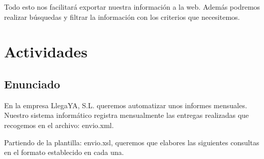 Todo esto nos facilitará exportar nuestra información a la web. Además podremos realizar búsquedas y filtrar la información con los criterios que necesitemos.

\section{Actividades}

\subsection{Enunciado}
En la empresa LlegaYA, S.L. queremos automatizar unos informes mensuales. Nuestro sistema informático registra mensualmente las entregas realizadas que recogemos en el archivo: envio.xml.

Partiendo de la plantilla: envio.xsl, queremos que elabores las siguientes consultas en el formato establecido en cada una.

